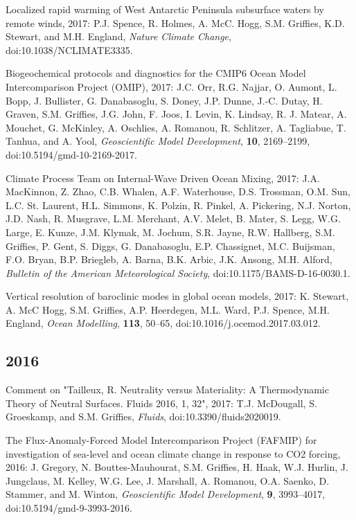 \begin{etaremune}
\item Localized rapid warming of West Antarctic Peninsula subsurface waters by remote winds, 2017: P.J. Spence, R. Holmes, A. McC. Hogg,   S.M. Grif\/f\/ies, K.D. Stewart, and M.H. England, {\it Nature Climate Change}, doi:10.1038/NCLIMATE3335.

\item Biogeochemical protocols and diagnostics for the CMIP6 Ocean Model Intercomparison Project (OMIP), 2017: J.C. Orr, R.G. Najjar, O. Aumont, L.  Bopp, J. Bullister, G. Danabasoglu, S. Doney,  J.P. Dunne, J.-C. Dutay, H. Graven, S.M. Grif\/f\/ies, J.G. John, F. Joos, I. Levin, K. Lindsay, R. J. Matear, A. Mouchet, G. McKinley, A. Oschlies, A. Romanou, R. Schlitzer, A. Tagliabue, T. Tanhua, and A. Yool, {\it Geoscientific Model Development}, {\bf 10}, 2169--2199, doi:10.5194/gmd-10-2169-2017.

\item Climate Process Team on Internal-Wave Driven Ocean Mixing, 2017:  J.A. MacKinnon, Z. Zhao, C.B. Whalen, A.F. Waterhouse, D.S. Trossman, O.M. Sun, L.C. St. Laurent, H.L. Simmons, K. Polzin, R. Pinkel, A. Pickering, N.J. Norton, J.D. Nash, R. Musgrave, L.M. Merchant, A.V. Melet, B. Mater, S. Legg, W.G. Large, E. Kunze, J.M. Klymak,  M. Jochum, S.R. Jayne, R.W. Hallberg, S.M. Grif\/f\/ies, P. Gent, S. Diggs, G. Danabasoglu, E.P. Chassignet, M.C. Buijsman, F.O. Bryan, B.P. Briegleb, A. Barna, B.K. Arbic,  J.K. Ansong, M.H. Alford, {\it Bulletin of the American Meteorological Society}, doi:10.1175/BAMS-D-16-0030.1.

\item Vertical resolution of baroclinic modes in global ocean models,  2017: K. Stewart, A. McC Hogg, S.M. Grif\/f\/ies, A.P. Heerdegen, M.L. Ward, P.J. Spence, M.H. England,  {\it Ocean Modelling}, {\bf 113}, 50--65, doi:10.1016/j.ocemod.2017.03.012.


\subsection*{\sc \color{Maroon} 2016}


\item Comment on "Tailleux, R. Neutrality versus Materiality: A Thermodynamic Theory of Neutral Surfaces. Fluids 2016, 1, 32", 2017: T.J. McDougall, S. Groeskamp, and S.M. Grif\/f\/ies, 
{\it Fluids}, doi:10.3390/fluids2020019. 

\item The Flux-Anomaly-Forced Model Intercomparison Project (FAFMIP) for investigation of sea-level and ocean climate change in response to CO2 forcing, 2016: J. Gregory, N. Bouttes-Mauhourat, S.M. Grif\/f\/ies, H. Haak, W.J. Hurlin, J.  Jungclaus, M. Kelley, W.G. Lee, J. Marshall, A. Romanou, O.A. Saenko, D. Stammer, and M.  Winton, {\it Geoscientific Model Development},
  {\bf 9}, 3993--4017, doi:10.5194/gmd-9-3993-2016.


\end{etaremune}
